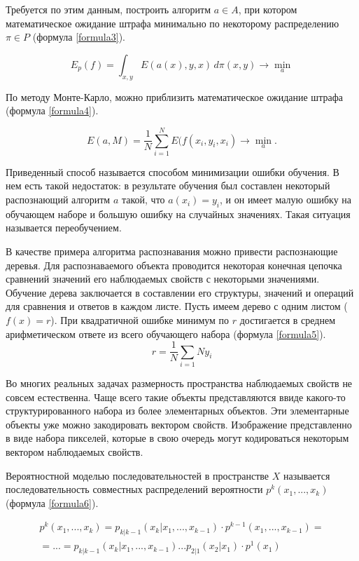 Требуется по этим данным, построить алгоритм $a \in A$, при котором математическое ожидание штрафа минимально по некоторому распределению $\pi \in P$ (формула \ref{formula3}).

\begin{equation}
E_p(f) = \int_{x, y} E(a(x), y, x) \, d \pi (x, y) \to \min_a
\label{formula3}
\end{equation}

По методу Монте-Карло, можно приблизить математическое ожидание штрафа (формула \ref{formula4}).

\begin{equation}
E(a, M) = \frac{1}{N} \sum_{i=1}^{N}E(f(x_i, y_i, x_i) \to \min_a.
\label{formula4}
\end{equation}

Приведенный способ называется способом минимизации ошибки обучения. В нем есть такой недостаток: в результате обучения был составлен некоторый распознающий алгоритм $a$ такой, что $a(x_i) = y_i$, и он имеет малую ошибку на обучающем наборе и большую ошибку на случайных значениях. Такая ситуация называется переобучением.

В качестве примера алгоритма распознавания можно привести распознающие деревья. Для распознаваемого объекта проводится некоторая конечная цепочка сравнений значений его наблюдаемых свойств с некоторыми значениями. Обучение дерева заключается в составлении его структуры, значений и операций для сравнения и ответов в каждом листе. Пусть имеем дерево с одним листом ($f(x) = r$). При квадратичной ошибке минимум по $r$ достигается в среднем арифметическом ответе из всего обучающего набора (формула \ref{formula5}).
\begin{equation}
r = \frac{1}{N}\sum_{i=1}{N}y_i
\label{formula5}
\end{equation}

Во многих реальных задачах размерность пространства наблюдаемых свойств не совсем естественна. Чаще всего такие объекты представляются ввиде какого-то структурированного набора из более элементарных объектов. Эти элементарные объекты уже можно закодировать вектором свойств. Изображение представленно в виде набора пикселей, которые в свою очередь могут кодироваться некоторым вектором наблюдаемых свойств.

Вероятностной моделью последовательностей в пространстве $X$ называется последовательность совместных распределений вероятности $p^k(x_1, ..., x_k)$ (формула \ref{formula6}).

\begin{multline}
p^k(x_1, ..., x_k) = p_{k|k-1}(x_k|x_1, ... , x_{k-1}) \cdot p^{k-1}(x_1, ... , x_{k-1}) = \\
= ... = p_{k|k-1}(x_k|x_1, ... , x_{k -1}) ... p_{2|1}(x_2|x_1) \cdot p^1(x_1)
\label{formula6}
\end{multline}


